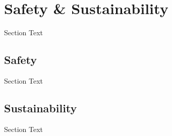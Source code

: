 
\setcounter{section}{4}
\section{Safety \& Sustainability}
\bigskip
Section Text

\break
\subsection{Safety}
\bigskip
Section Text


\break
\subsection{Sustainability}
\bigskip
Section Text
